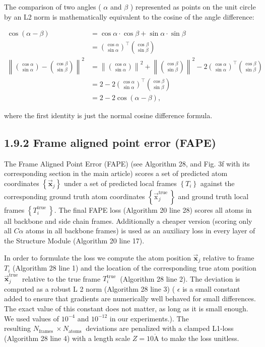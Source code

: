 \documentclass[10pt]{article}
\def\AA{\mathring{\mathrm{A}}}
\begin{document}
The comparison of two angles ( $\alpha$ and $\beta$ ) represented as points on the unit circle by an L2 norm is mathematically equivalent to the cosine of the angle difference:


\begin{align*}
\cos (\alpha-\beta) & =\cos \alpha \cdot \cos \beta+\sin \alpha \cdot \sin \beta \\
& =\binom{\cos \alpha}{\sin \alpha}^{\top}\binom{\cos \beta}{\sin \beta}  \tag{8}\\
\left\|\binom{\cos \alpha}{\sin \alpha}-\binom{\cos \beta}{\sin \beta}\right\|^{2} & =\left\|\binom{\cos \alpha}{\sin \alpha}\right\|^{2}+\left\|\binom{\cos \beta}{\sin \beta}\right\|^{2}-2\binom{\cos \alpha}{\sin \alpha}^{\top}\binom{\cos \beta}{\sin \beta} \\
& =2-2\binom{\cos \alpha}{\sin \alpha}^{\top}\binom{\cos \beta}{\sin \beta} \\
& =2-2 \cos (\alpha-\beta), \tag{9}
\end{align*}


where the first identity is just the normal cosine difference formula.

\subsection*{1.9.2 Frame aligned point error (FAPE)}
The Frame Aligned Point Error (FAPE) (see Algorithm 28, and Fig. 3f with its corresponding section in the main article) scores a set of predicted atom coordinates $\left\{\overrightarrow{\mathbf{x}}_{j}\right\}$ under a set of predicted local frames $\left\{T_{i}\right\}$ against the corresponding ground truth atom coordinates $\left\{\overrightarrow{\mathrm{x}}_{j}^{\text {true }}\right\}$ and ground truth local frames $\left\{T_{i}^{\text {true }}\right\}$. The final FAPE loss (Algorithm 20 line 28) scores all atoms in all backbone and side chain frames. Additionally a cheaper version (scoring only all $C \alpha$ atoms in all backbone frames) is used as an auxiliary loss in every layer of the Structure Module (Algorithm 20 line 17).

In order to formulate the loss we compute the atom position $\overrightarrow{\mathbf{x}}_{j}$ relative to frame $T_{i}$ (Algorithm 28 line 1) and the location of the corresponding true atom position $\overrightarrow{\mathbf{x}}_{j}^{\text {true }}$ relative to the true frame $T_{i}^{\text {true }}$ (Algorithm 28 line 2). The deviation is computed as a robust L 2 norm (Algorithm 28 line 3) ( $\epsilon$ is a small constant added to ensure that gradients are numerically well behaved for small differences. The exact value of this constant does not matter, as long as it is small enough. We used values of $10^{-4}$ and $10^{-12}$ in our experiments.). The\\
resulting $N_{\text {frames }} \times N_{\text {atoms }}$ deviations are penalized with a clamped L1-loss (Algorithm 28 line 4) with a length scale $Z=10 \AA$ to make the loss unitless.
\end{document}
